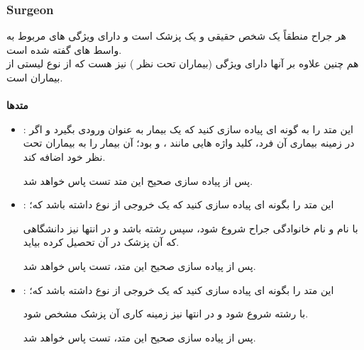         \subsubsection{Surgeon}
        هر جراح منطقاً یک شخص حقیقی و یک پزشک است و دارای ویژگی های مربوط به 
        واسط های گفته شده
        است.
        \\
        هم چنین علاوه بر آنها دارای ویژگی 
        (بیماران تحت نظر )
        نیز هست که از نوع لیستی از بیماران است.
        \\
        \\
        \textbf{متدها}
        \begin{itemize}
        \item 
            \grayBox{\textcolor{orange}{Acceptable}}
            :
            این متد
            را به گونه ای پیاده سازی کنید که یک بیمار به عنوان ورودی بگیرد و اگر در زمینه بیماری آن فرد، 
            کلید واژه هایی مانند 
            \grayBox{\textcolor{red}{Cancer}}
            ،
            \grayBox{\textcolor{red}{Appendix}}
            و
            \grayBox{\textcolor{red}{Kidney}}
            بود؛ آن بیمار را به بیماران تحت نظر خود اضافه کند.
            
            پس از پیاده سازی صحیح این متد تست
            \grayBox{\textcolor{dkgreen}{AddingPatientsToSurgeon}}
            پاس خواهد شد.

        \item
            \grayBox{\textcolor{orange}{GraduatedFrom}}
            :
            این متد را بگونه ای پیاده سازی کنید که یک خروجی از نوع 
            \grayBox{\textcolor{blue}{string}}
            داشته باشد که؛
            
            با نام و نام خانوادگی جراح شروع شود، سپس رشته 
            باشد و در انتها نیز دانشگاهی که آن پزشک در آن تحصیل کرده بیاید.
            
            پس از پیاده سازی صحیح این متد، تست
            \grayBox{\textcolor{dkgreen}{GraduatingSurgeons}}
            پاس خواهد شد.
            
        \item
            \grayBox{\textcolor{orange}{Work}}
            :
            این متد را بگونه ای پیاده سازی کنید که یک خروجی از نوع 
            \grayBox{\textcolor{blue}{string}}
            داشته باشد که؛
            
            با رشته
            شروع شود و در انتها نیز زمینه کاری آن پزشک مشخص شود.
            
            پس از پیاده سازی صحیح این متد، تست
            \grayBox{\textcolor{dkgreen}{WorkingSurgeons}}
            پاس خواهد شد.
        \end{itemize}
        
